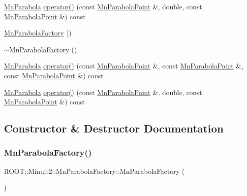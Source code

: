 \begin{DoxyCompactItemize}
\item 
\mbox{\hyperlink{classROOT_1_1Minuit2_1_1MnParabola}{Mn\+Parabola}} \mbox{\hyperlink{classROOT_1_1Minuit2_1_1MnParabolaFactory_ab4b6a74b071f4d780dbf6b4663c188b3}{operator()}} (const \mbox{\hyperlink{classROOT_1_1Minuit2_1_1MnParabolaPoint}{Mn\+Parabola\+Point}} \&, double, const \mbox{\hyperlink{classROOT_1_1Minuit2_1_1MnParabolaPoint}{Mn\+Parabola\+Point}} \&) const
\item 
\mbox{\hyperlink{classROOT_1_1Minuit2_1_1MnParabolaFactory_a6170ddac807544cd8f13dbb0b59fb568}{Mn\+Parabola\+Factory}} ()
\item 
\mbox{\hyperlink{classROOT_1_1Minuit2_1_1MnParabolaFactory_ab5b7289c1e63637bc2ecc9ac051b57a5}{$\sim$\+Mn\+Parabola\+Factory}} ()
\item 
\mbox{\hyperlink{classROOT_1_1Minuit2_1_1MnParabola}{Mn\+Parabola}} \mbox{\hyperlink{classROOT_1_1Minuit2_1_1MnParabolaFactory_aa5ff96ea03013f1dcbbac298fe26e484}{operator()}} (const \mbox{\hyperlink{classROOT_1_1Minuit2_1_1MnParabolaPoint}{Mn\+Parabola\+Point}} \&, const \mbox{\hyperlink{classROOT_1_1Minuit2_1_1MnParabolaPoint}{Mn\+Parabola\+Point}} \&, const \mbox{\hyperlink{classROOT_1_1Minuit2_1_1MnParabolaPoint}{Mn\+Parabola\+Point}} \&) const
\item 
\mbox{\hyperlink{classROOT_1_1Minuit2_1_1MnParabola}{Mn\+Parabola}} \mbox{\hyperlink{classROOT_1_1Minuit2_1_1MnParabolaFactory_ab4b6a74b071f4d780dbf6b4663c188b3}{operator()}} (const \mbox{\hyperlink{classROOT_1_1Minuit2_1_1MnParabolaPoint}{Mn\+Parabola\+Point}} \&, double, const \mbox{\hyperlink{classROOT_1_1Minuit2_1_1MnParabolaPoint}{Mn\+Parabola\+Point}} \&) const
\end{DoxyCompactItemize}


\subsection{Constructor \& Destructor Documentation}
\mbox{\label{classROOT_1_1Minuit2_1_1MnParabolaFactory_a6170ddac807544cd8f13dbb0b59fb568}} 
\subsubsection{\texorpdfstring{MnParabolaFactory()}{MnParabolaFactory()}\hspace{0.1cm}{\footnotesize\ttfamily [1/3]}}
{\footnotesize\ttfamily R\+O\+O\+T\+::\+Minuit2\+::\+Mn\+Parabola\+Factory\+::\+Mn\+Parabola\+Factory (\begin{DoxyParamCaption}{ }\end{DoxyParamCaption})\hspace{0.3cm}{\ttfamily [inline]}}

